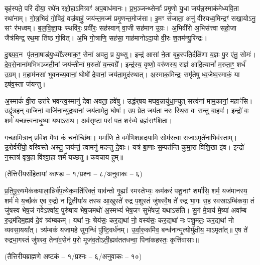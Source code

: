 बृह॑स्पते॒ परि॑ दीया॒ रथे॑न रक्षो॒हाऽमित्राꣳ॑ अप॒बाध॑मानः। प्र॒भ॒ञ्जन्थ्सेनाः᳚ प्रमृ॒णो यु॒धा जय॑न्न॒स्माक॑मेध्यवि॒ता रथा॑नाम्। गो॒त्र॒भिदं॑ गो॒विदं॒ वज्र॑बाहुं॒ जय॑न्त॒मज्म॑ प्रमृ॒णन्त॒मोज॑सा। इ॒मꣳ स॑जाता॒ अनु॑ वीरयध्व॒मिन्द्रꣳ॑ सखा॒योऽनु॒ सꣳ र॑भध्वम्। ब॒ल॒वि॒ज्ञा॒यः स्थवि॑रः॒ प्रवी॑रः॒ सह॑स्वान् वा॒जी सह॑मान उ॒ग्रः। अ॒भिवी॑रो अ॒भिस॑त्त्वा सहो॒जा जैत्र॑मिन्द्र॒ रथ॒मा ति॑ष्ठ गो॒वित्। अ॒भि गो॒त्राणि॒ सह॑सा॒ गाह॑मानोऽदा॒यो वी॒रः श॒तम॑न्यु॒रिन्द्रः॑।

दु॒श्च्य॒व॒न पृ॑तना॒षाड॑यु॒ध्यो᳚ऽस्माक॒ꣳ॒ सेना॑ अवतु॒ प्र यु॒थ्सु। इन्द्र॑ आसां ने॒ता बृह॒स्पति॒र्दक्षि॑णा य॒ज्ञः पु॒र ए॑तु॒ सोमः॑। दे॒व॒से॒नाना॑मभिभञ्जती॒नां जय॑न्तीनां म॒रुतो॑ य॒न्त्वग्रे᳚। इन्द्र॑स्य॒ वृष्णो॒ वरु॑णस्य॒ राज्ञ॑ आदि॒त्यानां᳚ म॒रुता॒ꣳ॒ शर्ध॑ उ॒ग्रम्। म॒हाम॑नसां भुवनच्य॒वानां॒ घोषो॑ दे॒वानां॒ जय॑ता॒मुद॑स्थात्। अ॒स्माक॒मिन्द्रः॒ समृ॑तेषु ध्व॒जेष्व॒स्माकं॒ या इष॑व॒स्ता ज॑यन्तु।

अ॒स्माकं॑ वी॒रा उत्त॑रे भवन्त्व॒स्मानु॑ देवा अवता॒ हवे॑षु। उद्ध॑र्‌षय मघव॒न्नायु॑धा॒न्युत् सत्त्व॑नां माम॒कानां॒ महाꣳ॑सि। उद्वृ॑त्रहन् वा॒जिनां॒ वाजि॑ना॒न्युद्रथा॑नां॒ जय॑तामेतु॒ घोषः॑। उप॒ प्रेत॒ जय॑ता नरः स्थि॒रा वः॑ सन्तु बा॒हवः॑। इन्द्रो॑ वः॒ शर्म॑ यच्छत्त्वनाधृ॒ष्या यथाऽस॑थ। अव॑सृष्टा॒ परा॑ पत॒ शर॑व्ये॒ ब्रह्म॑सꣳशिता।

गच्छा॒मित्रा॒न् प्रवि॑श॒ मैषां॒ कं च॒नोच्छि॑षः। मर्मा॑णि ते॒ वर्म॑भिश्छादयामि॒ सोम॑स्त्वा॒ राजा॒ऽमृते॑ना॒भिव॑स्ताम्। उ॒रोर्वरी॑यो॒ वरि॑वस्ते अस्तु॒ जय॑न्तं॒ त्वामनु॑ मदन्तु दे॒वाः। यत्र॑ बा॒णाः स॒म्पत॑न्ति कुमा॒रा वि॑शि॒खा इ॑व। इन्द्रो॑ न॒स्तत्र॑ वृत्र॒हा वि॑श्वा॒हा शर्म॑ यच्छतु॥
कवचाय हुम्॥

{\small \closesection}

\centerline{\normalsize (तैत्तिरीयसंहितायां काण्डः – १/प्रश्नः – ८/अनुवाकः – ६)}

प्र॒ति॒पू॒रु॒षमेक॑कपाला॒न्निर्व॑प॒त्येक॒मति॑रिक्तं॒ याव॑न्तो गृ॒ह्याः᳚ स्मस्तेभ्यः॒ कम॑करं पशू॒नाꣳ शर्मा॑सि॒ शर्म॒ यज॑मानस्य॒ शर्म॑ मे य॒च्छैक॑ ए॒व रु॒द्रो न द्वि॒तीया॑य तस्थ आ॒खुस्ते॑ रुद्र प॒शुस्तं जु॑षस्वै॒ष ते॑ रुद्र भा॒गः स॒ह स्वस्राऽम्बि॑कया॒ तं जु॑षस्व भेष॒जं गवेऽश्वा॑य॒ पुरु॑षाय भेष॒जमथो॑ अ॒स्मभ्यं॑ भेष॒जꣳ सुभे॑षजं॒ यथाऽस॑ति। सु॒गं मे॒षाय॑ मे॒ष्या॑ अवा᳚म्ब रु॒द्रम॑दिम॒ह्यव॑ दे॒वं त्र्य॑म्बकम्। यथा॑ नः॒ श्रेय॑सः॒ कर॒द्यथा॑ नो॒ वस्य॑सः॒ कर॒द्यथा॑ नः पशु॒मतः॒ कर॒द्यथा॑ नो व्यवसा॒यया᳚त्। त्र्य॑म्बकं यजामहे सुग॒न्धिं पु॑ष्टि॒वर्ध॑नम्। उ॒र्वा॒रु॒कमि॑व॒ बन्ध॑नान्मृ॒त्योर्मु॑क्षीय॒ माऽमृता᳚त्॥ ए॒ष ते॑ रुद्रभा॒गस्तं जु॑षस्व॒ तेना॑व॒सेन॑ प॒रो मूज॑व॒तोऽती॒ह्यव॑ततधन्वा॒ पिना॑कहस्तः॒ कृत्ति॑वासाः॥


\centerline{\normalsize (तैत्तिरीयब्राह्मणे अष्टकं – १/प्रश्नः – ६/अनुवाकः – १०)}

